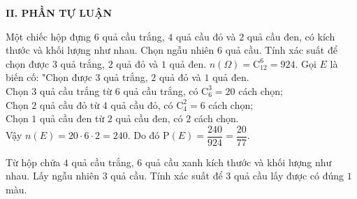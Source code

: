 \noindent\textbf{II. PHẦN TỰ LUẬN}
\begin{bt}%
	Một chiếc hộp đựng $6$ quả cầu trắng, $4$ quả cầu đỏ và $2$ quả cầu đen, có kích thước và khối lượng như nhau. Chọn ngẫu nhiên $6$ quả cầu. Tính xác suất để chọn được $3$ quả trắng, $2$ quả đỏ và $1$ quả đen.
	\loigiai
	{
		$n(\Omega)=\mathrm{C}_{12}^{6}=924$. Gọi $E$ là biến cố: "Chọn được $3$ quả trắng, $2$ quả đỏ và $1$ quả đen.\\
		Chọn $3$ quả cầu trắng từ $6$ quả cầu trắng, có $\mathrm{C}_6^3=20$ cách chọn;\\
		Chọn $2$ quả cầu đỏ từ $4$ quả cầu đỏ, có $\mathrm{C}^2_4=6$ cách chọn;\\
		Chọn $1$ quả cầu đen từ $2$ quả cầu đen, có $2$ cách chọn.\\
		Vậy $n(E)=20\cdot6\cdot 2=240$. Do đó $\mathrm{P}(E)=\dfrac{240}{924}=\dfrac{20}{77}$.
	}	
\end{bt}
\begin{bt}%
	Từ hộp chứa $4$ quả cầu trắng, $6$ quả cầu xanh kích thước và khối lượng như nhau. Lấy ngẫu nhiên $3$ quả cầu. Tính xác suất để $3$ quả cầu lấy được có đúng $1$ màu.
\end{bt}
